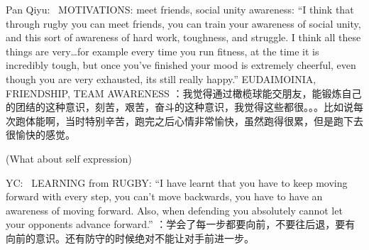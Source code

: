 \begin{CJK}{UTF8}{gbsn}
        Pan Qiyu:
         MOTIVATIONS: meet friends, social unity awareness: “I think that through rugby you can meet friends, you can train your awareness of social unity, and this sort of awareness of hard work, toughness, and struggle. I think all these things are very…for example every time you run fitness, at the time it is incredibly tough, but once you’ve finished your mood is extremely cheerful, even though you are very exhausted, its still really happy.” EUDAIMOINIA, FRIENDSHIP, TEAM AWARENESS	：我觉得通过橄榄球能交朋友，能锻炼自己的团结的这种意识，刻苦，艰苦，奋斗的这种意识，我觉得这些都很。。。比如说每次跑体能啊，当时特别辛苦，跑完之后心情非常愉快，虽然跑得很累，但是跑下去很愉快的感觉。 









        (What about self expression)

        YC:
         LEARNING from RUGBY: “I have learnt that you have to keep moving forward with every step, you can’t move backwards, you have to have an awareness of moving forward.  Also, when defending you absolutely cannot let your opponents advance forward.”	：学会了每一步都要向前，不要往后退，要有向前的意识。还有防守的时候绝对不能让对手前进一步。 


\end{CJK}
